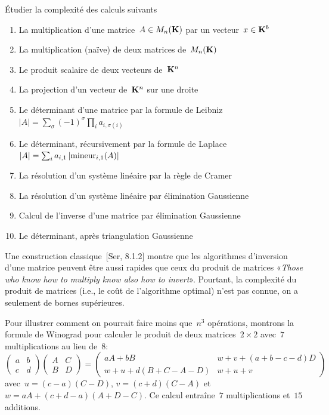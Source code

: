 \begin{exercice}Étudier la complexité des calculs suivants
	\begin{enumerate}
		\item La multiplication d'une matrice~$A\in M_n(\mathbf{K})$ par un
			vecteur~$x\in\mathbf{K}^b$
		\item La multiplication (naïve) de deux matrices de~$M_n(\mathbf{K})$
		\item Le produit scalaire de deux vecteurs de~$\mathbf{K}^n$
		\item La projection d'un vecteur de~$\mathbf{K}^n$ sur une droite
		\item Le déterminant d'une matrice par la formule de
			Leibniz~$|A|=\sum_\sigma(-1)^\sigma\prod_i a_{i,\sigma(i)}$
		\item Le déterminant, récursivement par la formule de
			Laplace~$\left|A\right|=\sum_ia_{i,1}\left|\mathrm{mineur}_{i,1}(A)\right|$
		\item La résolution d'un système linéaire par la règle de Cramer
		\item La résolution d'un système linéaire par élimination Gaussienne
		\item Calcul de l'inverse d'une matrice par élimination Gaussienne
		\item Le déterminant, après triangulation Gaussienne
	\end{enumerate}
\end{exercice}

Une construction classique~[Ser, 8.1.2] montre que les algorithmes
d'inversion d'une matrice peuvent être aussi rapides que ceux du produit de
matrices «\emph{Those who know how to multiply know also how to invert}».
Pourtant, la complexité du produit de matrices (i.e., le coût de l'algorithme
optimal) n'est pas connue, on a seulement de bornes supérieures.

Pour illustrer comment on pourrait faire moins que~$n^3$ opérations, montrons
la formule de Winograd pour calculer le produit de deux
matrices~$2\times 2$ avec~$7$ multiplications au lieu de~$8$:
\[
	\begin{pmatrix}
		a & b \\ c & d
	\end{pmatrix}
	\begin{pmatrix}
		A & C \\ B & D
	\end{pmatrix}
	=
	\begin{pmatrix}
		aA+bB & w+v+(a+b-c-d)D \\
		w+u+d(B+C-A-D) & w+u+v
	\end{pmatrix}
\]
avec~$u=(c-a)(C-D)$, $v=(c+d)(C-A)$ et~$w=aA+(c+d-a)(A+D-C)$.  Ce calcul
entraîne~$7$ multiplications et~$15$ additions.

